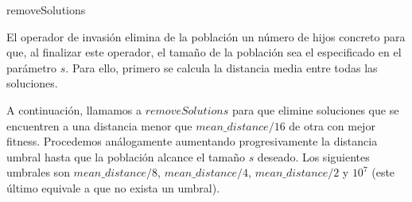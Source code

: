 \documentclass[10pt,a4paper]{article}
\begin{document}
\begin{algorithm}[H]
	\caption{removeSolutions}
\end{algorithm}

El operador de invasión elimina de la población un número de hijos concreto para que, al finalizar este operador, el tamaño de la población sea el especificado en el parámetro $s$. Para ello, primero se calcula la distancia media entre todas las soluciones. 

A continuación, llamamos a $removeSolutions$ para que elimine soluciones que se encuentren a una distancia menor que $mean\_distance/16$ de otra con mejor fitness. Procedemos análogamente aumentando progresivamente la distancia umbral hasta que la población alcance el tamaño $s$ deseado. Los siguientes umbrales son $mean\_distance/8$, $mean\_distance/4$, $mean\_distance/2$ y $10^7$ (este último equivale a que no exista un umbral).
\end{document}
